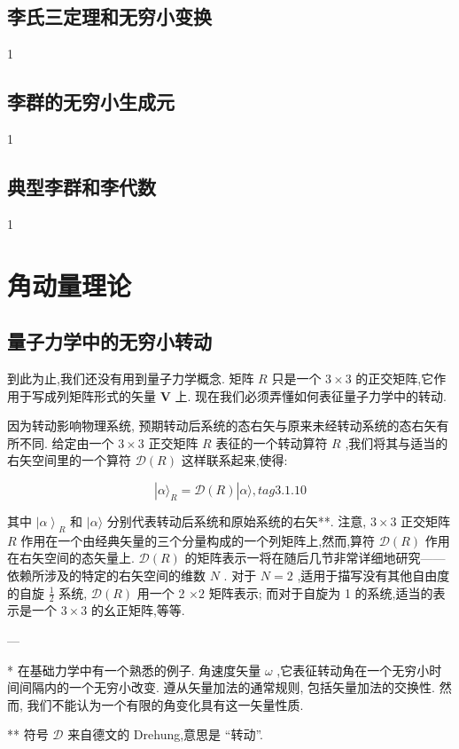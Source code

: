 \subsection{李氏三定理和无穷小变换}
1
\subsection{李群的无穷小生成元}
1
\subsection{典型李群和李代数}
1

\section{角动量理论}
\subsection{量子力学中的无穷小转动} 

到此为止,我们还没有用到量子力学概念. 矩阵 $R$ 只是一个 $3 \times 3$ 的正交矩阵,它作用于写成列矩阵形式的矢量 $\mathbf{V}$ 上. 现在我们必须弄懂如何表征量子力学中的转动.

因为转动影响物理系统, 预期转动后系统的态右矢与原来未经转动系统的态右矢有所不同. 给定由一个 $3 \times 3$ 正交矩阵 $R$ 表征的一个转动算符 $R$ ,我们将其与适当的右矢空间里的一个算符 $\mathcal{D}\left( R\right)$ 这样联系起来,使得:

$$
|\alpha {\rangle }_{R} = \mathcal{D}\left( R\right) |\alpha \rangle , tag{3.1.10}
$$

其中 ${\left| \alpha \right\rangle }_{R}$ 和 $|\alpha \rangle$ 分别代表转动后系统和原始系统的右矢**. 注意, $3 \times 3$ 正交矩阵 $R$ 作用在一个由经典矢量的三个分量构成的一个列矩阵上,然而,算符 $\mathcal{D}\left( R\right)$ 作用在右矢空间的态矢量上. $\mathcal{D}\left( R\right)$ 的矩阵表示一将在随后几节非常详细地研究——依赖所涉及的特定的右矢空间的维数 $N$ . 对于 $N = 2$ ,适用于描写没有其他自由度的自旋 $\frac{1}{2}$ 系统, $\mathcal{D}\left( R\right)$ 用一个 2 $\times 2$ 矩阵表示; 而对于自旋为 1 的系统,适当的表示是一个 $3 \times 3$ 的幺正矩阵,等等.

---

* 在基础力学中有一个熟悉的例子. 角速度矢量 $\omega$ ,它表征转动角在一个无穷小时间间隔内的一个无穷小改变. 遵从矢量加法的通常规则, 包括矢量加法的交换性. 然而, 我们不能认为一个有限的角变化具有这一矢量性质.

** 符号 $\mathcal{D}$ 来自德文的 Drehung,意思是 “转动”.

